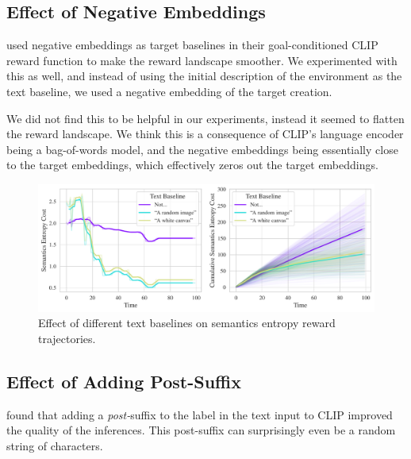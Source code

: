 
\subsection{Effect of Negative Embeddings}
\label{sec:negative-embeddings}
\cite{negprompt} used negative embeddings as target baselines in their goal-conditioned CLIP reward function to make the reward landscape smoother.
We experimented with this as well, and instead of using the initial description of the environment as the text baseline, we used a negative embedding of the target creation.

We did not find this to be helpful in our experiments, instead it seemed to flatten the reward landscape.
We think this is a consequence of CLIP's language encoder being a bag-of-words model, and the negative embeddings being essentially close to the target embeddings, which effectively zeros out the target embeddings.

\begin{figure}[h]
    \centering
    \includegraphics[width=\textwidth]{images/baseline_comparison.pdf}
    \caption{Effect of different text baselines on semantics entropy reward trajectories.}
    \label{fig:baseline}
\end{figure}

\subsection{Effect of Adding Post-Suffix}
\label{sec:post-suffix}
\cite{waffleclip} found that adding a \emph{post-}suffix to the label in the text input to CLIP improved the quality of the inferences.
This post-suffix can surprisingly even be a random string of characters.

